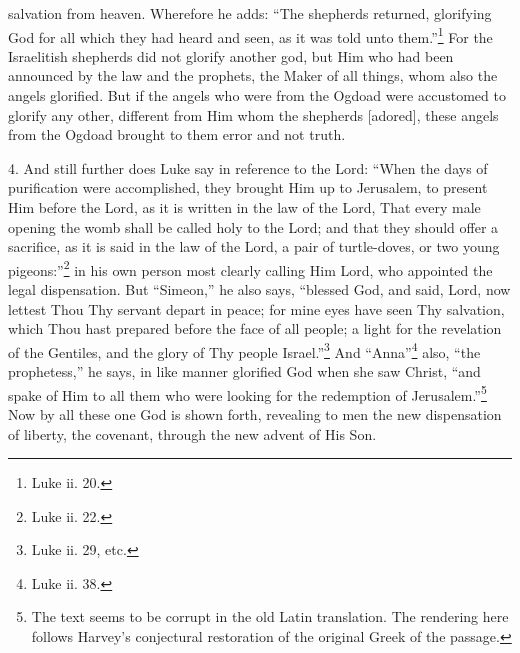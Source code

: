 salvation from heaven. Wherefore he adds: “The shepherds returned, glorifying God for all which they had heard and seen, as it was told unto them.”\footnote{Luke ii. 20.} For the Israelitish shepherds did not glorify another god, but Him who had been announced by the law and the prophets, the Maker of all things, whom also the angels glorified. But if the angels who were from the Ogdoad were accustomed to glorify any other, different from Him whom the shepherds [adored], these angels from the Ogdoad brought to them error and not truth.

4. And still further does Luke say in reference to the Lord: “When the days of purification were accomplished, they brought Him up to Jerusalem, to present Him before the Lord, as it is written in the law of the Lord, That every male opening the womb shall be called holy to the Lord; and that they should offer a sacrifice, as it is said in the law of the Lord, a pair of turtle-doves, or two young pigeons:”\footnote{Luke ii. 22.} in his own person most clearly calling Him Lord, who appointed the legal dispensation. But “Simeon,” he also says, “blessed God, and said, Lord, now lettest Thou Thy servant depart in peace; for mine eyes have seen Thy salvation, which Thou hast prepared before the face of all people; a light for the revelation of the Gentiles, and the glory of Thy people Israel.”\footnote{Luke ii. 29, etc.} And “Anna”\footnote{Luke ii. 38.} also, “the prophetess,” he says, in like manner glorified God when she saw Christ, “and spake of Him to all them who were looking for the redemption of Jerusalem.”\footnote{The text seems to be corrupt in the old Latin translation. The rendering here follows Harvey’s conjectural restoration of the original Greek of the passage.} Now by all these one God is shown forth, revealing to men the new dispensation of liberty, the covenant, through the new advent of His Son.

